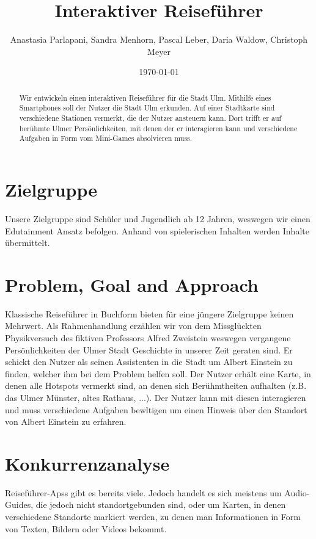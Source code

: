\documentclass[]{hci-proposal}
\title{Interaktiver Reiseführer}
\author{Anastasia Parlapani, Sandra Menhorn, Pascal Leber, Daria Waldow, Christoph Meyer}
\date{\today}
\begin{document}

\maketitle

\begin{abstract}
  Wir entwickeln einen interaktiven Reiseführer für die Stadt Ulm. Mithilfe eines Smartphones soll
  der Nutzer die Stadt Ulm erkunden. Auf einer Stadtkarte sind verschiedene Stationen vermerkt, die
  der Nutzer ansteuern kann. Dort trifft er auf berühmte Ulmer Persönlichkeiten, mit denen der er
  interagieren kann und verschiedene Aufgaben in Form vom Mini-Games absolvieren muss.



\end{abstract}


\section{Zielgruppe}
Unsere Zielgruppe sind Schüler und Jugendlich ab 12 Jahren, weswegen wir einen Edutainment Ansatz befolgen. Anhand
von spielerischen Inhalten werden Inhalte übermittelt.


\section{Problem, Goal and Approach}
Klassische Reiseführer in Buchform bieten für eine jüngere Zielgruppe keinen Mehrwert.
Als Rahmenhandlung erzählen wir von dem Missglückten Physikversuch des fiktiven Professors Alfred Zweistein weswegen vergangene Persönlichkeiten der Ulmer Stadt Geschichte in unserer Zeit geraten sind.
Er schickt den Nutzer als seinen Assistenten in die Stadt um Albert Einstein zu finden, welcher ihm bei dem Problem helfen soll.
Der Nutzer erhält eine Karte, in denen alle Hotspots vermerkt sind, an denen sich Berühmtheiten aufhalten (z.B. das Ulmer
Münster, altes Rathaus, ...). Der Nutzer kann mit diesen interagieren und muss verschiedene Aufgaben bewltigen um einen
Hinweis über den Standort von Albert Einstein zu erfahren.


\section{Konkurrenzanalyse}

Reiseführer-Apss gibt es bereits viele. Jedoch handelt es sich meistens um Audio-Guides, die jedoch nicht standortgebunden sind,
oder um Karten, in denen verschiedene Standorte markiert werden, zu denen man Informationen in Form von Texten, Bildern oder
Videos bekommt.
\end{document}
